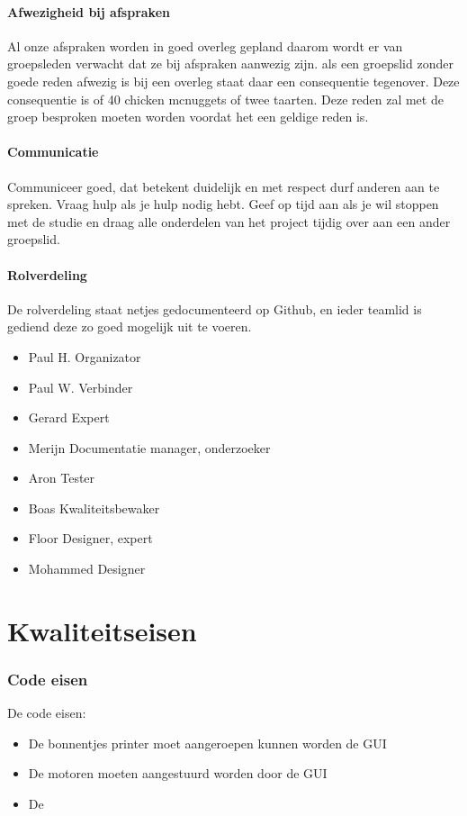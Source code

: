\documentclass{article}
\begin{document}
\paragraph{Afwezigheid bij afspraken}

Al onze afspraken worden in goed overleg gepland daarom wordt er van groepsleden verwacht
dat ze bij afspraken aanwezig zijn. als een groepslid zonder goede reden afwezig is bij een
overleg staat daar een consequentie tegenover. Deze consequentie is of 40 chicken mcnuggets
of twee taarten. Deze reden zal met de groep besproken moeten worden voordat het een geldige reden is.

\paragraph{Communicatie}

Communiceer goed, dat betekent duidelijk en met respect durf anderen aan te spreken.
Vraag hulp als je hulp nodig hebt.
Geef op tijd aan als je wil stoppen met de studie en draag alle onderdelen van het project tijdig
over aan een ander groepslid.

\paragraph{Rolverdeling}

De rolverdeling staat netjes gedocumenteerd op Github, en ieder teamlid is gediend deze zo
goed mogelijk uit te voeren.
\begin{itemize}
\item Paul H. Organizator
\item Paul W. Verbinder
\item Gerard Expert
\item Merijn Documentatie manager, onderzoeker
\item Aron Tester
\item Boas Kwaliteitsbewaker
\item Floor Designer, expert
\item Mohammed Designer
\end{itemize}

\newpage

\section{Kwaliteitseisen}


\subsubsection{Code eisen}
De code eisen:
\begin{itemize}
	\item De bonnentjes printer moet aangeroepen kunnen worden de GUI
	\item De motoren moeten aangestuurd worden door de GUI
	\item De 
\end{itemize}
\end{document}
